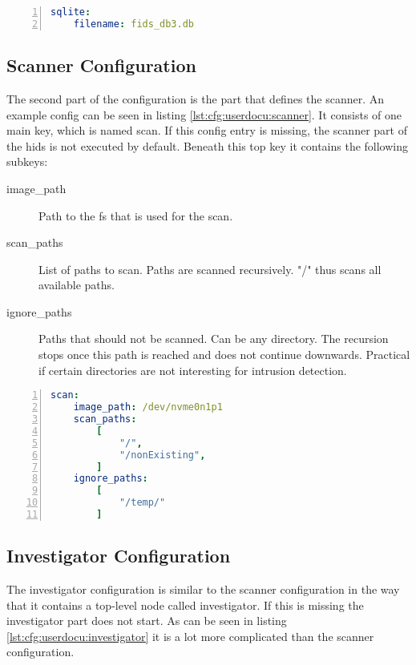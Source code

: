 \begin{lstlisting}[language=yaml, numbers=left, caption=SQLite Configuration, label=lst:cfg:userdocu:sqlite]
sqlite:
	filename: fids_db3.db
\end{lstlisting}

\subsection{Scanner Configuration}

The second part of the configuration is the part that defines the scanner. An example config can be seen in listing \ref{lst:cfg:userdocu:scanner}. It consists of one main key, which is named scan. If this config entry is missing, the scanner part of the \gls{hids} is not executed by default. Beneath this top key it contains the following subkeys:

\begin{description}
	\item [image\_path] Path to the \gls{fs} that is used for the scan.
	\item [scan\_paths] List of paths to scan. Paths are scanned recursively. "/" thus scans all available paths.
	\item [ignore\_paths] Paths that should not be scanned. Can be any directory. The recursion stops once this path is reached and does not continue downwards. Practical if certain directories are not interesting for intrusion detection.
\end{description}

\begin{lstlisting}[language=yaml, numbers=left, caption=Scanner Configuration, label=lst:cfg:userdocu:scanner]
scan:
	image_path: /dev/nvme0n1p1
	scan_paths: 
		[
			"/",
			"/nonExisting",
		]
	ignore_paths: 
		[
			"/temp/"
		]
\end{lstlisting}

\subsection{Investigator Configuration}
\label{sec:conf:userdocu:investigator}

The investigator configuration is similar to the scanner configuration in the way that it contains a top-level node called investigator. If this is missing the investigator part does not start. As can be seen in listing \ref{lst:cfg:userdocu:investigator} it is a lot more complicated than the scanner configuration. 

